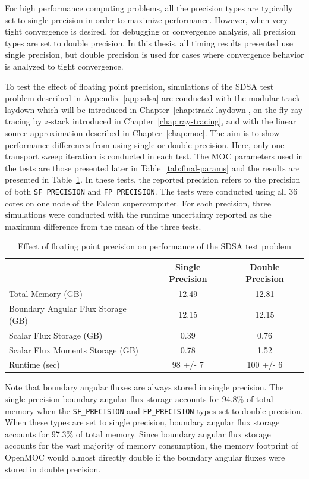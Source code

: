 For high performance computing problems, all the precision types are typically set to single precision in order to maximize performance. However, when very tight convergence is desired, for debugging or convergence analysis, all precision types are set to double precision. In this thesis, all timing results presented use single precision, but double precision is used for cases where convergence behavior is analyzed to tight convergence.

To test the effect of floating point precision, simulations of the SDSA test problem described in Appendix~\ref{app:sdsa} are conducted with the modular track laydown which will be introduced in Chapter~\ref{chap:track-laydown}, on-the-fly ray tracing by $z$-stack introduced in Chapter~\ref{chap:ray-tracing}, and with the linear source approximation described in Chapter~\ref{chap:moc}. The aim is to show performance differences from using single or double precision. Here, only one transport sweep iteration is conducted in each test. The \ac{MOC} parameters used in the tests are those presented later in Table~\ref{tab:final-params} and the results are presented in Table~\ref{tab:precision-results}. In these tests, the reported precision refers to the precision of both \texttt{SF_PRECISION} and \texttt{FP_PRECISION}. The tests were conducted using all 36 cores on one node of the Falcon supercomputer. For each precision, three simulations were conducted with the runtime uncertainty reported as the maximum difference from the mean of the three tests.

\begin{table}[ht]
	\centering
	\caption{Effect of floating point precision on performance of the SDSA test problem}
	\medskip
	\begin{tabular}{lcc}
		\hline
		 & Single Precision & Double Precision \\
		 \hline
		Total Memory (GB) & 12.49 & 12.81 \\
		Boundary Angular Flux Storage (GB) & 12.15 & 12.15 \\
		Scalar Flux Storage (GB) & 0.39 & 0.76\\
		Scalar Flux Moments Storage (GB) & 0.78 & 1.52 \\
		Runtime (sec) & 98 +/- 7 & 100 +/- 6 \\
		\hline
	\end{tabular}
	\label{tab:precision-results}
\end{table}

Note that boundary angular fluxes are always stored in single precision. The single precision boundary angular flux storage accounts for 94.8\% of total memory when the \texttt{SF_PRECISION} and \texttt{FP_PRECISION} types set to double precision. When these types are set to single precision, boundary angular flux storage accounts for 97.3\% of total memory. Since boundary angular flux storage accounts for the vast majority of memory consumption, the memory footprint of OpenMOC would almost directly double if the boundary angular fluxes were stored in double precision.

